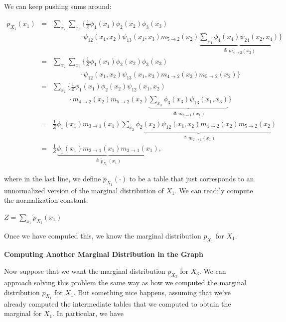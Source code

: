 \documentclass[6008notes.tex]{subfiles}
\begin{document}
We can keep pushing sums around:

\begin{eqnarray*}
p_{X_{1}}(x_{1}) & = & \sum_{x_{2}}\sum_{x_{3}}
\bigg\{ \frac{1}{Z}\phi_{1}(x_{1})\phi_{2}(x_{2})\phi_{3}(x_{3}) \\
& & \qquad\quad\;\;\;
\cdot \psi_{12}(x_{1},x_{2})\psi_{13}(x_{1},x_{3})m_{5\rightarrow2}(x_{2})\underbrace{\sum_{x_{4}}\phi_{4}(x_{4})\psi_{24}(x_{2},x_{4})}_{\triangleq m_{4\rightarrow2}(x_{2})} \bigg\} \\
 & = & \sum_{x_{2}}\sum_{x_{3}}
\bigg\{ \frac{1}{Z}\phi_{1}(x_{1})\phi_{2}(x_{2})\phi_{3}(x_{3}) \\
& & \qquad\quad\;\;\;
\cdot \psi_{12}(x_{1},x_{2})\psi_{13}(x_{1},x_{3})m_{4\rightarrow2}(x_{2})m_{5\rightarrow2}(x_{2}) \bigg\} \\
 & = & \sum_{x_{2}}\bigg\{ \frac{1}{Z}\phi_{1}(x_{1})\phi_{2}(x_{2})\psi_{12}(x_{1},x_{2}) \\
& & \qquad\;
\cdot m_{4\rightarrow2}(x_{2})m_{5\rightarrow2}(x_{2})\underbrace{\sum_{x_{3}}\phi_{3}(x_{3})\psi_{13}(x_{1},x_{3})}_{\triangleq m_{3\rightarrow1}(x_{1})} \bigg\} \\
 & = & \frac{1}{Z}\phi_{1}(x_{1})m_{3\rightarrow1}(x_{1})\underbrace{\sum_{x_{2}}\phi_{2}(x_{2})\psi_{12}(x_{1},x_{2})m_{4\rightarrow2}(x_{2})m_{5\rightarrow2}(x_{2})}_{\triangleq m_{2\rightarrow1}(x_{1})}\\
 & = & \frac{1}{Z}\underbrace{\phi_{1}(x_{1})m_{2\rightarrow1}(x_{1})m_{3\rightarrow1}(x_{1})}_{\triangleq\widetilde{p}_{X_{1}}(x_{1})},
\end{eqnarray*}

where in the last line, we define $\widetilde{p}_{X_{1}}(\cdot )$ to be a table that just corresponds to an unnormalized version of the marginal distribution of $X_1$. We can readily compute the normalization constant:

{\centering$Z = \sum_{x_{1}}\widetilde{p}_{X_{1}}(x_{1})$ \par}

Once we have computed this, we know the marginal distribution $p_{X_1}$ for $X_1$.

\textbf{Computing Another Marginal Distribution in the Graph}

Now suppose that we want the marginal distribution $p_{X_3}$ for $X_3$. We can approach solving this problem the same way as how we computed the marginal distribution $p_{X_1}$ for $X_1$. But something nice happens, assuming that we've already computed the intermediate tables that we computed to obtain the marginal for $X_1$. In particular, we have
\end{document}
